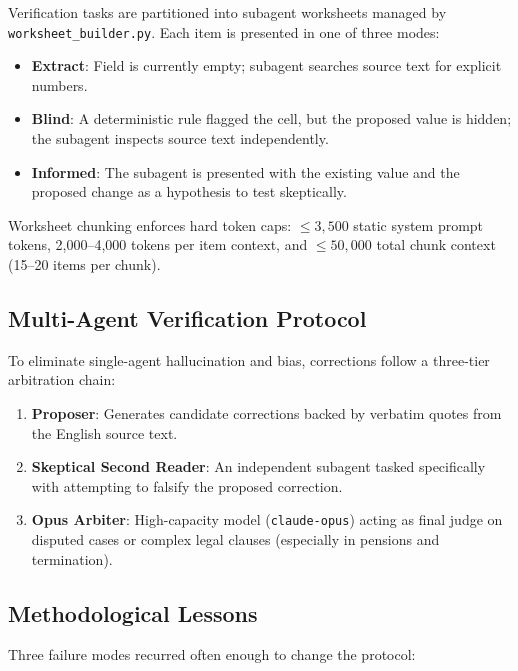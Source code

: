Verification tasks are partitioned into subagent worksheets managed by \texttt{worksheet\_builder.py}. Each item is presented in one of three modes:
\begin{itemize}[leftmargin=1.5em]
  \item \textbf{Extract}: Field is currently empty; subagent searches source text for explicit numbers.
  \item \textbf{Blind}: A deterministic rule flagged the cell, but the proposed value is hidden; the subagent inspects source text independently.
  \item \textbf{Informed}: The subagent is presented with the existing value and the proposed change as a hypothesis to test skeptically.
\end{itemize}

Worksheet chunking enforces hard token caps: $\le 3{,}500$ static system prompt tokens, 2,000--4,000 tokens per item context, and $\le 50{,}000$ total chunk context (15--20 items per chunk).

\subsection{Multi-Agent Verification Protocol}

To eliminate single-agent hallucination and bias, corrections follow a three-tier arbitration chain:
\begin{enumerate}[leftmargin=1.5em]
  \item \textbf{Proposer}: Generates candidate corrections backed by verbatim quotes from the English source text.
  \item \textbf{Skeptical Second Reader}: An independent subagent tasked specifically with attempting to falsify the proposed correction.
  \item \textbf{Opus Arbiter}: High-capacity model (\texttt{claude-opus}) acting as final judge on disputed cases or complex legal clauses (especially in pensions and termination).
\end{enumerate}

\subsection{Methodological Lessons}
\label{subsec:methodology-lessons}

Three failure modes recurred often enough to change the protocol:

